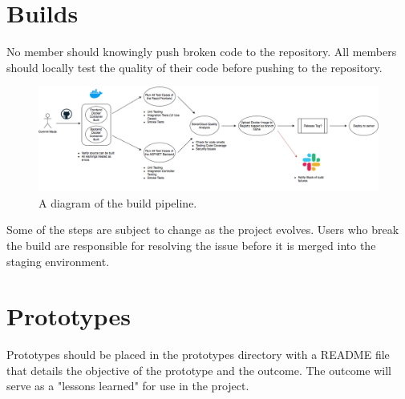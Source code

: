\documentclass{scrreprt}
\begin{document}
\section{Builds}

No member should knowingly push broken code to the repository.
All members should locally test the quality of their code before
pushing to the repository. 

\begin{figure}[H]
    \includegraphics[width=\linewidth]{build-pipeline}
    \caption{A diagram of the build pipeline.}
    \label{fig:build}
\end{figure}

Some of the steps are subject to change as the project evolves.
Users who break the build are responsible for resolving the issue
before it is merged into the staging environment.

\section{Prototypes}

Prototypes should be placed in the prototypes directory with a README
file that details the objective of the prototype and the outcome. The
outcome will serve as a "lessons learned" for use in the project.
\end{document}
